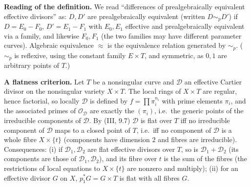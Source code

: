 \documentclass[11pt]{article}
\begin{document}
\pf
\textbf{Reading of the definition.} We read ``differences of prealgebraically equivalent effective divisors'' as: $D,D'$ are prealgebraically equivalent (written $D\sim_pD'$) if $D=E_0-F_0$, $D'=E_1-F_1$ with $E_0,E_1$ effective and prealgebraically equivalent via a family, and likewise $F_0,F_1$ (the two families may have different parameter curves). Algebraic equivalence $\approx$ is the equivalence relation generated by $\sim_p$. ($\sim_p$ is reflexive, using the constant family $E\times T$, and symmetric, as $0,1$ are arbitrary points of $T$.)

\textbf{A flatness criterion.} Let $T$ be a nonsingular curve and $\mathcal D$ an effective Cartier divisor on the nonsingular variety $X\times T$. The local rings of $X\times T$ are regular, hence factorial, so locally $\mathcal D$ is defined by $f=\prod\pi_i^{n_i}$ with prime elements $\pi_i$, and the associated primes of $\mathcal O_{\mathcal D}$ are exactly the $(\pi_i)$, i.e.\ the generic points of the irreducible components of $\mathcal D$. By (III, 9.7) $\mathcal D$ is flat over $T$ iff no irreducible component of $\mathcal D$ maps to a closed point of $T$, i.e.\ iff no component of $\mathcal D$ is a whole fibre $X\times\{t\}$ (components have dimension $2$ and fibres are irreducible). Consequences: (i) if $\mathcal D_1,\mathcal D_2$ are flat effective divisors over $T$, so is $\mathcal D_1+\mathcal D_2$ (its components are those of $\mathcal D_1,\mathcal D_2$), and its fibre over $t$ is the sum of the fibres (the restrictions of local equations to $X\times\{t\}$ are nonzero and multiply); (ii) for an effective divisor $G$ on $X$, $p_1^*G=G\times T$ is flat with all fibres $G$.
\end{document}
